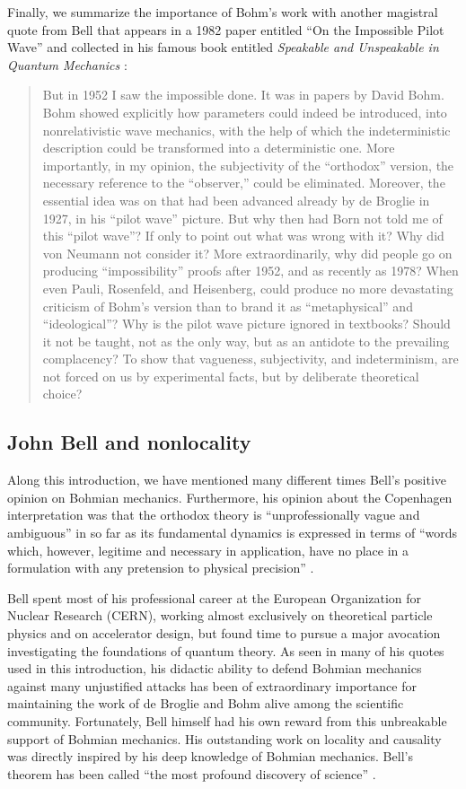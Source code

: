 \documentclass[onecolumn,nofootinbib, secnumarabic, amsmath, nobibnotes,12pt,aps,pra]{revtex4-1}
\begin{document}
Finally, we summarize the importance of Bohm's work with another magistral quote from Bell that appears in a 1982 paper entitled ``On the Impossible Pilot Wave'' and collected in his famous book entitled \textit{Speakable and Unspeakable in Quantum Mechanics} \cite{om.Bell1987}:
\begin{quote}
But in 1952 I saw the impossible done. It was in papers by David Bohm. Bohm showed explicitly how parameters could indeed be introduced, into nonrelativistic wave mechanics, with the help of which the indeterministic description could be transformed into a deterministic one. More importantly, in my opinion, the subjectivity of the ``orthodox'' version, the necessary reference to the ``observer,'' could be eliminated. Moreover, the essential idea was on that had been advanced already by de Broglie in 1927, in his ``pilot wave'' picture. But why then had Born not told me of this ``pilot wave''? If only to point out what was wrong with it? Why did von Neumann not consider it? More extraordinarily, why did people go on producing ``impossibility'' proofs after 1952, and as recently as 1978? When even Pauli, Rosenfeld, and Heisenberg, could produce no more devastating criticism of Bohm's version than to brand it as ``metaphysical'' and ``ideological''? Why is the pilot wave picture ignored in textbooks? Should it not be taught, not as the only way, but as an antidote to the prevailing complacency? To show that vagueness, subjectivity, and indeterminism, are not forced on us by experimental facts, but by deliberate theoretical choice?
\end{quote}

\subsection{John Bell and nonlocality} \label{om.sec_intro.8}

Along this introduction, we have mentioned many different times Bell's positive opinion on Bohmian mechanics. Furthermore, his opinion about the Copenhagen interpretation was that the orthodox theory is ``unprofessionally vague and ambiguous'' \cite{om.Bell1987,om.bell1990,om.bell1982,om.Bell1964} in so far as its fundamental dynamics is expressed in terms of ``words which, however, legitime and necessary in application, have no place in a formulation with any pretension to physical precision'' \cite{om.bell1990}.

Bell spent most of his professional career at the European
Organization for Nuclear Research (CERN), working almost exclusively
on theoretical particle physics and on accelerator design, but found
time to pursue a major avocation investigating the foundations of
quantum theory. As seen in many of his quotes used in this
introduction, his didactic ability to defend Bohmian mechanics
against many unjustified attacks has been of extraordinary
importance for maintaining the work of de Broglie and Bohm alive
among the scientific community. Fortunately, Bell himself had his
own reward from this unbreakable support of Bohmian mechanics. His
outstanding work on locality and causality was directly inspired by
his deep knowledge of Bohmian mechanics. Bell's theorem has been
called ``the most profound discovery of science''
\cite{om.stapp1977}.
\end{document}
